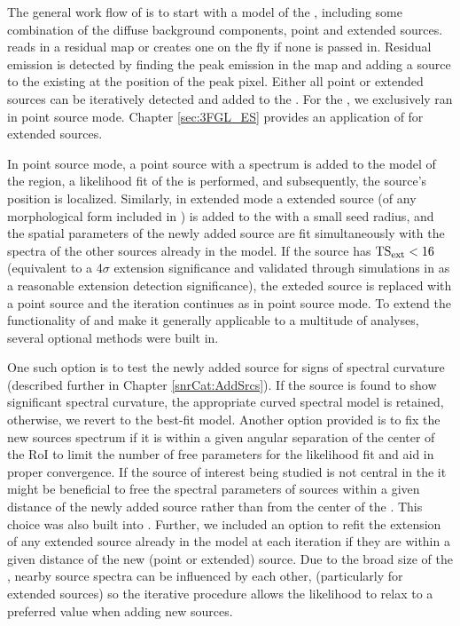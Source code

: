 {The general work flow of \srcs{} is to start with a model of the \roi{}, including some combination of the diffuse background components, point  and extended sources. \srcs{} reads in a residual \ts{} map or creates one on the fly if none is passed in. Residual emission is detected by finding the peak emission in the \ts{} map and adding a source to the existing \roi{} at the position of the peak pixel. Either all point or extended sources can be iteratively detected and added to the \roi{}. For the \snrcat{}, we exclusively ran \srcs{} in point source mode. Chapter \ref{sec:3FGL_ES} provides an application of \srcs{} for extended sources. 

In point source mode, a point source with a \pl{} spectrum is added to the model of the region, a likelihood fit of the \roi{} is performed, and subsequently, the source's position is localized. Similarly, in extended mode a \pl{} extended source (of any morphological form included in \ptlike{}) is added to the \roi{} with a small seed radius, and the spatial parameters of the newly added source are fit simultaneously with the spectra of the other sources already in the model. If the source has ${\rm TS_{ext} < 16}$ (equivalent to a  4$\sigma$ extension significance and validated through simulations in \cite{Lande12} as a reasonable extension detection significance), the exteded source is replaced with a point source and the iteration continues as in point source mode. To extend the functionality of \srcs{} and make it generally applicable to a multitude of \lat{} analyses, several optional methods were built in. 

One such option is to test the newly added source for signs of spectral curvature (described further in Chapter \ref{snrCat:AddSrcs}). If the source is found to show significant spectral curvature, the appropriate curved spectral model is retained, otherwise, we revert to the best-fit \pl{} model. Another option provided is to fix the new sources spectrum if it is within a given angular separation of the center of the RoI to limit the number of free parameters for the likelihood fit and aid in proper convergence. If the source of interest being studied is not central in the \roi{} it might be beneficial to free the spectral parameters of sources within a given distance of the newly added source rather than from the center of the \roi{}. This choice was also built into \srcs{}. Further, we included an option to refit the extension of any extended source already in the model at each iteration if they are within a given distance of the new (point or extended) source. Due to the broad size of the \psf{}, nearby source spectra can be influenced by each other, (particularly for extended sources) so the iterative procedure allows the likelihood to relax to a preferred value when adding new sources.

}
